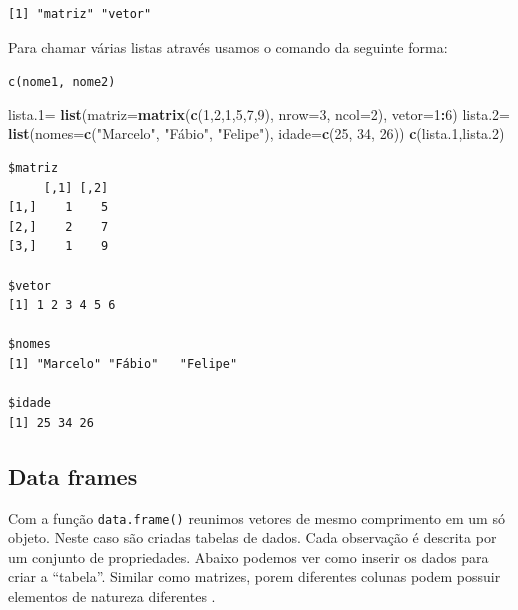 \documentclass[12pt,brazil,oneside]{book}
\newenvironment{Shaded}{\begin{snugshade}}{\end{snugshade}}
\newcommand{\DataTypeTok}[1]{\textcolor[rgb]{0.13,0.29,0.53}{#1}}
\newcommand{\DecValTok}[1]{\textcolor[rgb]{0.00,0.00,0.81}{#1}}
\newcommand{\FloatTok}[1]{\textcolor[rgb]{0.00,0.00,0.81}{#1}}
\newcommand{\KeywordTok}[1]{\textcolor[rgb]{0.13,0.29,0.53}{\textbf{#1}}}
\newcommand{\NormalTok}[1]{#1}
\newcommand{\OperatorTok}[1]{\textcolor[rgb]{0.81,0.36,0.00}{\textbf{#1}}}
\newcommand{\StringTok}[1]{\textcolor[rgb]{0.31,0.60,0.02}{#1}}
\begin{document}
\begin{verbatim}
[1] "matriz" "vetor" 
\end{verbatim}

Para chamar várias listas através usamos o comando da seguinte forma:

\texttt{c(nome1,\ nome2)}

\begin{Shaded}
\begin{Highlighting}[]
\NormalTok{lista}\FloatTok{.1}\NormalTok{=}\StringTok{ }\KeywordTok{list}\NormalTok{(}\DataTypeTok{matriz=}\KeywordTok{matrix}\NormalTok{(}\KeywordTok{c}\NormalTok{(}\DecValTok{1}\NormalTok{,}\DecValTok{2}\NormalTok{,}\DecValTok{1}\NormalTok{,}\DecValTok{5}\NormalTok{,}\DecValTok{7}\NormalTok{,}\DecValTok{9}\NormalTok{), }\DataTypeTok{nrow=}\DecValTok{3}\NormalTok{, }\DataTypeTok{ncol=}\DecValTok{2}\NormalTok{),}
              \DataTypeTok{vetor=}\DecValTok{1}\OperatorTok{:}\DecValTok{6}\NormalTok{)}
\NormalTok{lista}\FloatTok{.2}\NormalTok{=}\StringTok{ }\KeywordTok{list}\NormalTok{(}\DataTypeTok{nomes=}\KeywordTok{c}\NormalTok{(}\StringTok{"Marcelo"}\NormalTok{, }\StringTok{"Fábio"}\NormalTok{, }\StringTok{"Felipe"}\NormalTok{), }
              \DataTypeTok{idade=}\KeywordTok{c}\NormalTok{(}\DecValTok{25}\NormalTok{, }\DecValTok{34}\NormalTok{, }\DecValTok{26}\NormalTok{))}
\KeywordTok{c}\NormalTok{(lista}\FloatTok{.1}\NormalTok{,lista}\FloatTok{.2}\NormalTok{)}
\end{Highlighting}
\end{Shaded}

\begin{verbatim}
$matriz
     [,1] [,2]
[1,]    1    5
[2,]    2    7
[3,]    1    9

$vetor
[1] 1 2 3 4 5 6

$nomes
[1] "Marcelo" "Fábio"   "Felipe" 

$idade
[1] 25 34 26
\end{verbatim}

\hypertarget{data-frames}{%
\subsection{Data frames}\label{data-frames}}

Com a função \texttt{data.frame()} reunimos vetores de mesmo comprimento em um só objeto. Neste caso são criadas tabelas de dados. Cada observação é descrita por um conjunto de propriedades. Abaixo podemos ver como inserir os dados para criar a ``tabela''. Similar como matrizes, porem diferentes colunas podem possuir elementos de natureza diferentes .
\end{document}
